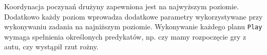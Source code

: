 Koordynacja poczynań drużyny zapewniona jest na najwyższym poziomie. Dodatkowo każdy poziom wprowadza dodatkowe parametry wykorzystywane przy wykonywaniu
zadania na najniższym poziomie.
Wykonywanie każdego planu \texttt{Play} wymaga spełnienia określonych predykatów, np. czy mamy rozpoczęcie gry z autu, czy wystąpił rzut rożny.

